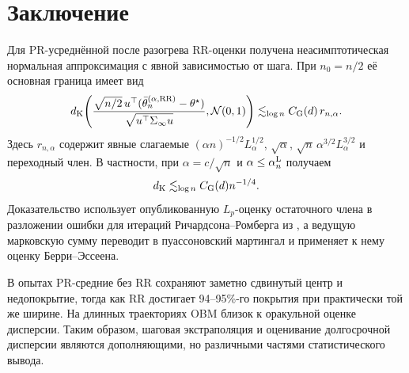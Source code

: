 \section*{Заключение}

Для PR-усреднённой после разогрева RR-оценки получена неасимптотическая
нормальная аппроксимация с явной зависимостью от шага. При $n_0=n/2$
её основная граница имеет вид
\[
 d_{\mathrm K}\!\left(
 \frac{\sqrt{n/2}\,u^\top
  (\bar{\theta}_n^{(\alpha,\mathrm{RR})}-\theta^\star)}
      {\sqrt{u^\top\Sigma_\infty u}},
 \mathcal{N}(0,1)\right)
 \lesssim_{\log{n}}
 C_{\rm G}(d)\,r_{n,\alpha}.
\]
Здесь $r_{n,\alpha}$ содержит явные слагаемые
$(\alpha n)^{-1/2}L_\alpha^{1/2}$, $\sqrt\alpha$,\linebreak
$\sqrt n\,\alpha^{3/2}L_\alpha^{3/2}$ и переходный член. В частности, при
$\alpha=c/\sqrt n$ и $\alpha\leq\alpha_n^{\rm L}$ получаем
\[
 d_{\mathrm K}\lesssim_{\log{n}} C_{\rm G}(d)n^{-1/4}.
\]
Доказательство использует опубликованную $L_p$-оценку остаточного члена в
разложении ошибки для итераций Ричардсона--Ромберга из
\cite{Levin2026}, а ведущую марковскую сумму переводит в пуассоновский
мартингал и применяет к нему оценку Берри--Эссеена.

В опытах PR-средние без RR сохраняют заметно сдвинутый центр и
недопокрытие, тогда как RR достигает 94--95\%-го покрытия при практически той
же ширине. На длинных траекториях OBM близок к оракульной оценке дисперсии.
Таким образом, шаговая экстраполяция и оценивание долгосрочной дисперсии
являются дополняющими, но различными частями статистического вывода.
